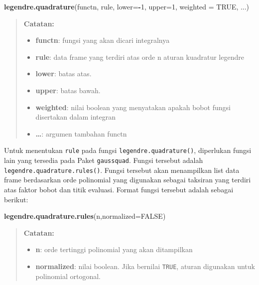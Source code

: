 \documentclass[]{book}
\newenvironment{Shaded}{\begin{snugshade}}{\end{snugshade}}
\newcommand{\DataTypeTok}[1]{\textcolor[rgb]{0.13,0.29,0.53}{#1}}
\newcommand{\DecValTok}[1]{\textcolor[rgb]{0.00,0.00,0.81}{#1}}
\newcommand{\KeywordTok}[1]{\textcolor[rgb]{0.13,0.29,0.53}{\textbf{#1}}}
\newcommand{\NormalTok}[1]{#1}
\newcommand{\OperatorTok}[1]{\textcolor[rgb]{0.81,0.36,0.00}{\textbf{#1}}}
\newcommand{\OtherTok}[1]{\textcolor[rgb]{0.56,0.35,0.01}{#1}}
\providecommand{\tightlist}{%
  \setlength{\itemsep}{0pt}\setlength{\parskip}{0pt}}
\theoremstyle{definition}
\theoremstyle{definition}
\theoremstyle{definition}
\theoremstyle{remark}
\begin{document}
\begin{Shaded}
\begin{Highlighting}[]
\KeywordTok{legendre.quadrature}\NormalTok{(functn, rule, }\DataTypeTok{lower=}\OperatorTok{-}\DecValTok{1}\NormalTok{, }\DataTypeTok{upper=}\DecValTok{1}\NormalTok{, }
  \DataTypeTok{weighted =} \OtherTok{TRUE}\NormalTok{, ...)}
\end{Highlighting}
\end{Shaded}

\begin{quote}
\textbf{Catatan:}

\begin{itemize}
\tightlist
\item
  \textbf{functn}: fungsi yang akan dicari integralnya
\item
  \textbf{rule}: data frame yang terdiri atas orde n aturan kuadratur legendre
\item
  \textbf{lower}: batas atas.
\item
  \textbf{upper}: batas bawah.
\item
  \textbf{weighted}: nilai boolean yang menyatakan apakah bobot fungsi disertakan dalam integran
\item
  \textbf{\ldots{}}: argumen tambahan functn
\end{itemize}
\end{quote}

Untuk menentukan \texttt{rule} pada fungsi \texttt{legendre.quadrature()}, diperlukan fungsi lain yang tersedia pada Paket \texttt{gaussquad}. Fungsi tersebut adalah \texttt{legendre.quadrature.rules()}. Fungsi tersebut akan menampilkan list data frame berdasarkan orde polinomial yang digunakan sebagai taksiran yang terdiri atas faktor bobot dan titik evaluasi. Format fungsi tersebut adalah sebagai berikut:

\begin{Shaded}
\begin{Highlighting}[]
\KeywordTok{legendre.quadrature.rules}\NormalTok{(n,}\DataTypeTok{normalized=}\OtherTok{FALSE}\NormalTok{)}
\end{Highlighting}
\end{Shaded}

\begin{quote}
\textbf{Catatan:}

\begin{itemize}
\tightlist
\item
  \textbf{n}: orde tertinggi polinomial yang akan ditampilkan
\item
  \textbf{normalized}: nilai boolean. Jika bernilai \texttt{TRUE}, aturan digunakan untuk polinomial ortogonal.
\end{itemize}
\end{quote}
\end{document}
